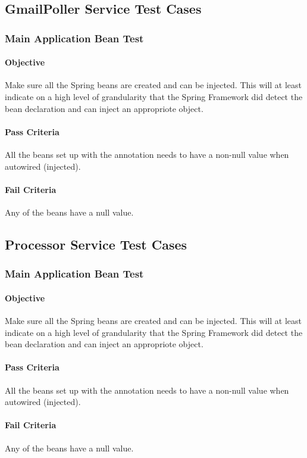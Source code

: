 \documentclass[hidelinks,english]{article}
\begin{document}
		\subsection{GmailPoller Service Test Cases}
			\subsubsection{Main Application Bean Test}\label{gmailapplicationbeanstest}
				\paragraph{Objective} Make sure all the Spring beans are created and can be injected. This will at least indicate on a high level of grandularity that the Spring Framework did detect the bean declaration and can inject an appropriote object.
				\paragraph{Pass Criteria} All the beans set up with the \emph{\@Bean} annotation needs to have a non-null value when autowired (injected).
				\paragraph{Fail Criteria} Any of the beans have a null value.
				
		\subsection{Processor Service Test Cases}
			\subsubsection{Main Application Bean Test}\label{processorapplicationbeanstest}
				\paragraph{Objective} Make sure all the Spring beans are created and can be injected. This will at least indicate on a high level of grandularity that the Spring Framework did detect the bean declaration and can inject an appropriote object.
				\paragraph{Pass Criteria} All the beans set up with the \emph{\@Bean} annotation needs to have a non-null value when autowired (injected).
				\paragraph{Fail Criteria} Any of the beans have a null value.
				
\end{document}
